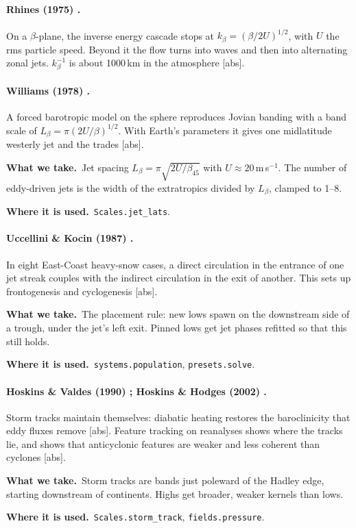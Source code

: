 \documentclass[11pt,a4paper]{article}
\newcommand{\verif}[1]{\textsf{\small[#1]}}
\newcommand{\takes}{\par\noindent\textbf{What we take.}\ }
\newcommand{\used}{\par\noindent\textbf{Where it is used.}\ }
\begin{document}
\paragraph{Rhines (1975) \cite{rhines1975}.}
On a $\beta$-plane, the inverse energy cascade stops at $k_\beta=(\beta/2U)^{1/2}$, with $U$
the rms particle speed. Beyond it the flow turns into waves and then into alternating zonal
jets. $k_\beta^{-1}$ is about 1000\,km in the atmosphere \verif{abs}.

\paragraph{Williams (1978) \cite{williams1978}.}
A forced barotropic model on the sphere reproduces Jovian banding with a band scale of
$L_\beta=\pi(2U/\beta)^{1/2}$. With Earth's parameters it gives one midlatitude westerly jet
and the trades \verif{abs}.
\takes Jet spacing $L_\beta=\pi\sqrt{2U/\beta_{45}}$ with $U\approx20$\,m\,s$^{-1}$. The
number of eddy-driven jets is the width of the extratropics divided by $L_\beta$, clamped to
1--8.
\used \texttt{Scales.jet\_lats}.

\paragraph{Uccellini \& Kocin (1987) \cite{uccellini1987}.}
In eight East-Coast heavy-snow cases, a direct circulation in the entrance of one jet
streak couples with the indirect circulation in the exit of another. This sets up
frontogenesis and cyclogenesis \verif{abs}.
\takes The placement rule: new lows spawn on the downstream side of a trough, under the
jet's left exit. Pinned lows get jet phases refitted so that this still holds.
\used \texttt{systems.population}, \texttt{presets.solve}.

\paragraph{Hoskins \& Valdes (1990) \cite{hoskins1990}; Hoskins \& Hodges (2002) \cite{hoskins2002}.}
Storm tracks maintain themselves: diabatic heating restores the baroclinicity that eddy fluxes
remove \verif{abs}. Feature tracking on reanalyses shows where the tracks lie, and shows that
anticyclonic features are weaker and less coherent than cyclones \verif{abs}.
\takes Storm tracks are bands just poleward of the Hadley edge, starting downstream of
continents. Highs get broader, weaker kernels than lows.
\used \texttt{Scales.storm\_track}, \texttt{fields.pressure}.
\end{document}
